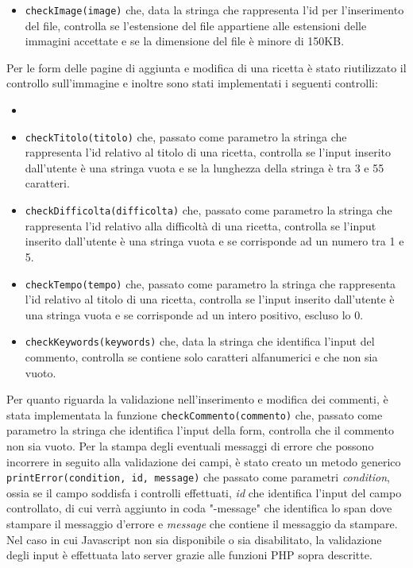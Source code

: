\begin{itemize}
	\item \texttt{checkImage(image)} che, data la stringa che rappresenta l'id per l'inserimento del file, controlla se l'estensione del file appartiene alle estensioni delle immagini accettate e se la dimensione del file è minore di 150KB.
\end{itemize}
Per le form delle pagine di aggiunta e modifica di una ricetta è stato riutilizzato il controllo sull'immagine e inoltre sono stati implementati i seguenti controlli:
\begin{itemize}
	\item 
	\item \texttt{checkTitolo(titolo)} che, passato come parametro la stringa che rappresenta l'id relativo al titolo di una ricetta, controlla se l'input inserito dall'utente è una stringa vuota e se la lunghezza della stringa è tra 3 e 55 caratteri.
	\item \texttt{checkDifficolta(difficolta)} che, passato come parametro la stringa che rappresenta l'id relativo alla difficoltà di una ricetta, controlla se l'input inserito dall'utente è una stringa vuota e se corrisponde ad un numero tra 1 e 5.
	\item \texttt{checkTempo(tempo)} che, passato come parametro la stringa che rappresenta l'id relativo al titolo di una ricetta, controlla se l'input inserito dall'utente è una stringa vuota e se corrisponde ad un intero positivo, escluso lo 0.
	\item \texttt{checkKeywords(keywords)} che, data la stringa che identifica l'input del commento, controlla se contiene solo caratteri alfanumerici e che non sia vuoto.
\end{itemize}
Per quanto riguarda la validazione nell'inserimento e modifica dei commenti, è stata implementata la funzione \texttt{checkCommento(commento)} che, passato come parametro la stringa che identifica l'input della form, controlla che il commento non sia vuoto. \newline
Per la stampa degli eventuali messaggi di errore che possono incorrere in seguito alla validazione dei campi, è stato creato un metodo generico \texttt{printError(condition, id, message)} che passato come parametri \textit{condition}, ossia se il campo soddisfa i controlli effettuati, \textit{id} che identifica l'input del campo controllato, di cui verrà aggiunto in coda "-message" che identifica lo span dove stampare il messaggio d'errore e \textit{message} che contiene il messaggio da stampare.
Nel caso in cui Javascript non sia disponibile o sia disabilitato, la validazione degli input è effettuata lato server grazie alle funzioni PHP sopra descritte.

